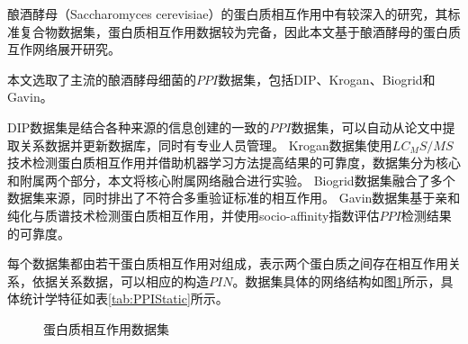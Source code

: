 酿酒酵母（Saccharomyces cerevisiae）的蛋白质相互作用中有较深入的研究，其标准复合物数据集，蛋白质相互作用数据较为完备，因此本文基于酿酒酵母的蛋白质互作网络展开研究。

本文选取了主流的酿酒酵母细菌的$PPI$数据集，包括DIP\cite{salwinski_database_2004}、Krogan\cite{krogan_global_2006}、Biogrid\cite{stark_biogrid_2006}和Gavin\cite{gavin_proteome_2006}。

DIP数据集是结合各种来源的信息创建的一致的$PPI$数据集，可以自动从论文中提取关系数据并更新数据库，同时有专业人员管理。
Krogan数据集使用$LC_MS/MS$技术检测蛋白质相互作用并借助机器学习方法提高结果的可靠度，数据集分为核心和附属两个部分，本文将核心附属网络融合进行实验。
Biogrid数据集融合了多个数据集来源，同时排出了不符合多重验证标准的相互作用。
Gavin数据集基于亲和纯化与质谱技术检测蛋白质相互作用，并使用socio-affinity指数评估$PPI$检测结果的可靠度。

每个数据集都由若干蛋白质相互作用对组成，表示两个蛋白质之间存在相互作用关系，依据关系数据，可以相应的构造$PIN$。数据集具体的网络结构如图\ref{fig:ppi-datasets}所示，具体统计学特征如表\ref{tab:PPIStatic}所示。

\begin{figure}[htbp]
    \centering
    \vskip0.5cm
    \vskip0.5cm
    \vskip0.5cm
    \caption{蛋白质相互作用数据集}
    \label{fig:ppi-datasets}
\end{figure}


